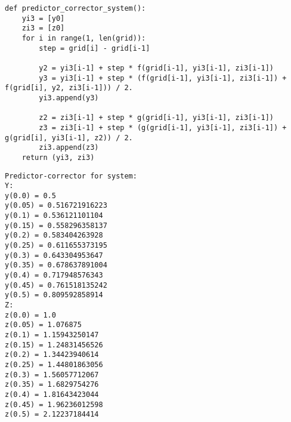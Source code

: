 {\small
\begin{verbatim}
def predictor_corrector_system():
    yi3 = [y0]
    zi3 = [z0]
    for i in range(1, len(grid)):
        step = grid[i] - grid[i-1]

        y2 = yi3[i-1] + step * f(grid[i-1], yi3[i-1], zi3[i-1])
        y3 = yi3[i-1] + step * (f(grid[i-1], yi3[i-1], zi3[i-1]) + f(grid[i], y2, zi3[i-1])) / 2.
        yi3.append(y3)

        z2 = zi3[i-1] + step * g(grid[i-1], yi3[i-1], zi3[i-1])
        z3 = zi3[i-1] + step * (g(grid[i-1], yi3[i-1], zi3[i-1]) + g(grid[i], yi3[i-1], z2)) / 2.
        zi3.append(z3)
    return (yi3, zi3)
\end{verbatim}
}

{\small
\begin{verbatim}
Predictor-corrector for system:
Y:
y(0.0) = 0.5
y(0.05) = 0.516721916223
y(0.1) = 0.536121101104
y(0.15) = 0.558296358137
y(0.2) = 0.583404263928
y(0.25) = 0.611655373195
y(0.3) = 0.643304953647
y(0.35) = 0.678637891004
y(0.4) = 0.717948576343
y(0.45) = 0.761518135242
y(0.5) = 0.809592858914
Z:
z(0.0) = 1.0
z(0.05) = 1.076875
z(0.1) = 1.15943250147
z(0.15) = 1.24831456526
z(0.2) = 1.34423940614
z(0.25) = 1.44801863056
z(0.3) = 1.56057712067
z(0.35) = 1.6829754276
z(0.4) = 1.81643423044
z(0.45) = 1.96236012598
z(0.5) = 2.12237184414
\end{verbatim}
}
